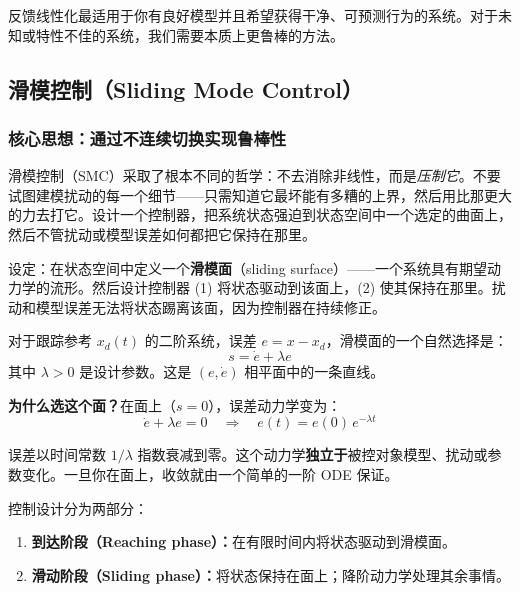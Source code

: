反馈线性化最适用于你有良好模型并且希望获得干净、可预测行为的系统。对于未知或特性不佳的系统，我们需要本质上更鲁棒的方法。

\subsection{滑模控制（Sliding Mode Control）}

\subsubsection{核心思想：通过不连续切换实现鲁棒性}

滑模控制（SMC）采取了根本不同的哲学：不去消除非线性，而是\textit{压制它}。不要试图建模扰动的每一个细节——只需知道它最坏能有多糟的上界，然后用比那更大的力去打它。设计一个控制器，把系统状态强迫到状态空间中一个选定的曲面上，然后不管扰动或模型误差如何都把它保持在那里。

设定：在状态空间中定义一个\textbf{滑模面}（sliding surface）——一个系统具有期望动力学的流形。然后设计控制器 (1) 将状态驱动到该面上，(2) 使其保持在那里。扰动和模型误差无法将状态踢离该面，因为控制器在持续修正。

对于跟踪参考 $x_d(t)$ 的二阶系统，误差 $e = x - x_d$，滑模面的一个自然选择是：
\begin{equation}
s = \dot{e} + \lambda e
\end{equation}
其中 $\lambda > 0$ 是设计参数。这是 $(e, \dot{e})$ 相平面中的一条直线。

\textbf{为什么选这个面？}在面上（$s = 0$），误差动力学变为：
\begin{equation}
\dot{e} + \lambda e = 0 \quad \Longrightarrow \quad e(t) = e(0)\,e^{-\lambda t}
\end{equation}

误差以时间常数 $1/\lambda$ 指数衰减到零。这个动力学\textbf{独立于}被控对象模型、扰动或参数变化。一旦你在面上，收敛就由一个简单的一阶 ODE 保证。

控制设计分为两部分：
\begin{enumerate}
    \item \textbf{到达阶段（Reaching phase）：}在有限时间内将状态驱动到滑模面。
    \item \textbf{滑动阶段（Sliding phase）：}将状态保持在面上；降阶动力学处理其余事情。
\end{enumerate}

